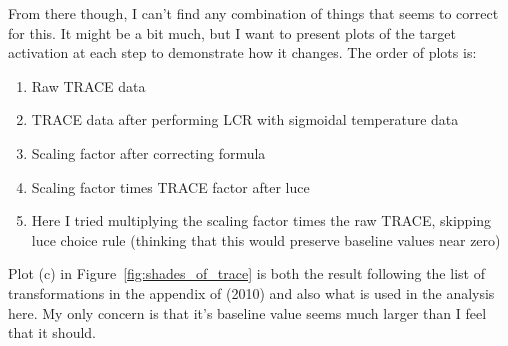 \documentclass{article}
\begin{document}
From there though, I can't find any combination of things that seems to correct for this. It might be a bit much, but I want to present plots of the target activation at each step to demonstrate how it changes. The order of plots is:

\begin{singlespace}
\begin{enumerate}
\vspace{-3mm}
\item Raw TRACE data
\item TRACE data after performing LCR with sigmoidal temperature data
\item Scaling factor after correcting formula
\item Scaling factor times TRACE factor after luce 
\item Here I tried multiplying the scaling factor times the raw TRACE, skipping luce choice rule (thinking that this would  preserve baseline values near zero)
\end{enumerate}
\end{singlespace}

Plot (c) in Figure~\ref{fig:shades_of_trace} is both the result following the list of transformations in the appendix of (2010) and also what is used in the analysis here. My only concern is that it's baseline value seems much larger than I feel that it should.
\end{document}
